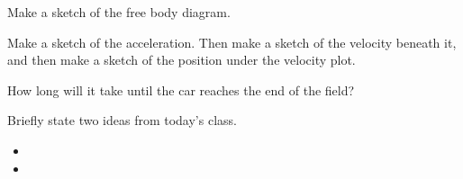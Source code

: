 \begin{problem}
  \begin{subproblem}
  \item Make a sketch of the free body diagram.
    \vspace{5em}
  \item Make a sketch of the acceleration. Then make a sketch of the
    velocity beneath it, and then make a sketch of the position under
    the velocity plot.
    \vfill
  \item How long will it take until the car reaches the end of the
    field?
    \vspace{4em}
  \end{subproblem}

\end{problem}

\postClass

\begin{problem}
\item Briefly state two ideas from today's class.
  \begin{itemize}
  \item 
  \item 
  \end{itemize}
\item 
  \begin{subproblem}
    \item
  \end{subproblem}
\end{problem}
